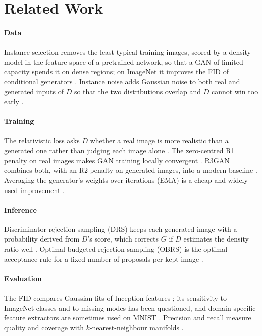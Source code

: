 \section{Related Work}
\paragraph{Data}
Instance selection removes the least typical training images, scored by a density model in the feature space of a pretrained network, so that a GAN of limited capacity spends it on dense regions; on ImageNet it improves the FID of conditional generators \cite{devries2020}. Instance noise adds Gaussian noise to both real and generated inputs of $D$ so that the two distributions overlap and $D$ cannot win too early \cite{sonderby2017,arjovsky2017}.

\paragraph{Training}
The relativistic loss asks $D$ whether a real image is more realistic than a generated one rather than judging each image alone \cite{jolicoeur2019}. The zero-centred R1 penalty on real images makes GAN training locally convergent \cite{mescheder2018}. R3GAN combines both, with an R2 penalty on generated images, into a modern baseline \cite{huang2024}. Averaging the generator's weights over iterations (EMA) is a cheap and widely used improvement \cite{yazici2019}.

\paragraph{Inference}
Discriminator rejection sampling (DRS) keeps each generated image with a probability derived from $D$'s score, which corrects $G$ if $D$ estimates the density ratio well \cite{azadi2019}. Optimal budgeted rejection sampling (OBRS) is the optimal acceptance rule for a fixed number of proposals per kept image \cite{verine2024}.

\paragraph{Evaluation}
The FID compares Gaussian fits of Inception features \cite{heusel2017,szegedy2016}; its sensitivity to ImageNet classes \cite{kynkaanniemi2023} and to missing modes \cite{lucic2018} has been questioned, and domain-specific feature extractors are sometimes used on MNIST \cite{binkowski2018}. Precision and recall measure quality and coverage with $k$-nearest-neighbour manifolds \cite{kynkaanniemi2019}.
